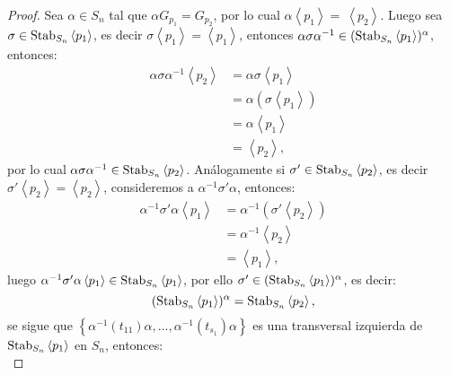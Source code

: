 \documentclass[12pt]{book}
\theoremstyle{definition}
\newcounter{in}
\begin{document}
\begin{proof} Sea $\alpha \in S_{n}$ tal que
$\alpha G_{p_{1}} = G_{p_{2}}$, por lo cual
$\alpha \left \langle p_{1} \right \rangle =~\left \langle p_{2}
\right \rangle$.  Luego sea
$\sigma \in \textup{Stab}_{S_{n}} \left \langle p_{1} \right \rangle$,
es decir
$\sigma \left \langle p_{1} \right \rangle = \left \langle p_{1}
\right \rangle$, entonces
$\alpha \sigma \alpha^{-1} \in ( \textup{Stab}_{S_{n}} \left \langle
  p_{1} \right \rangle)^{\alpha}$, entonces:
\begin{equation}
\begin{aligned}
\alpha \sigma \alpha^{-1}  \left \langle p_{2} \right \rangle &= \alpha \sigma  \left \langle p_{1} \right \rangle \\
& = \alpha (\sigma  \left \langle p_{1} \right \rangle) \\
& = \alpha  \left \langle p_{1} \right \rangle \\
& =  \left \langle p_{2} \right \rangle,
\end{aligned}
\end{equation}
por lo cual
$\alpha \sigma \alpha^{-1} \in \textup{Stab}_{S_{n}} \left \langle
  p_{2} \right \rangle$. Análogamente si
$\sigma' \in \textup{Stab}_{S_{n}} \left \langle p_{2} \right
\rangle$, es decir
$\sigma' \left \langle p_{2} \right \rangle = \left \langle p_{2}
\right \rangle$, consideremos a $\alpha^{-1} \sigma' \alpha$,
entonces:
\begin{equation}
\begin{aligned}
\alpha^{-1} \sigma' \alpha  \left \langle p_{1} \right \rangle & = \alpha^{-1} (\sigma'  \left \langle p_{2} \right \rangle) \\
& = \alpha^{-1}  \left \langle p_{2} \right \rangle \\
& =  \left \langle p_{1} \right \rangle,
\end{aligned}
\end{equation}
luego $\alpha^{-1} \sigma' \alpha \left \langle p_{1} \right \rangle
\in \textup{Stab}_{S_{n}} \left \langle p_{1} \right \rangle$, por ello
$\sigma' \in (\textup{Stab}_{S_{n}} \left \langle p_{1} \right
\rangle)^{\alpha}$, es decir:
$$(\textup{Stab}_{S_{n}}  \left \langle p_{1} \right \rangle)^{\alpha} = \textup{Stab}_{S_{n}}  \left \langle p_{2} \right \rangle,$$
se sigue que
$\left \{ \alpha^{-1} (t_{11}) \alpha,\ldots, \alpha^{-1} (t_{s_{1}})
  \alpha \right \}$ es una transversal izquierda de
$\textup{Stab}_{S_{n}} \left \langle p_{1} \right \rangle$ en $S_{n}$,
entonces:
\begin{equation}

\end{equation}
\end{proof}
\end{document}
